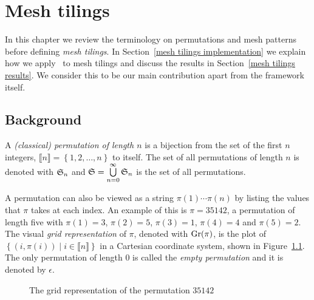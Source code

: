 \chapter{Mesh tilings\label{mesh tilings chapter}}

In this chapter we review the terminology on permutations and mesh patterns 
before defining \emph{mesh tilings}. In Section~\ref{mesh tilings 
implementation} we explain how we apply \CombCov\ to mesh tilings and discuss 
the results in Section~\ref{mesh tilings results}. We consider this to be our
main contribution apart from the framework itself.

\section{Background\label{mesh tilings background}}

\begin{definition}
  A \emph{(classical) permutation of length $n$} is a bijection from the set of 
  the first $n$ integers, $\llbracket n \rrbracket = \left\{ 1, 2, \ldots, n 
  \right\}$ to itself. The set of all permutations of length $n$ is denoted with 
  $\S_n$ and $\S = \bigcup\limits_{n=0}^{\infty}\S_n$ is the set of all 
  permutations.
\end{definition}

A permutation can also be viewed as a string $\pi(1)\cdots\pi(n)$ by listing the 
values that $\pi$ takes at each index. An example of this is $\pi = 35142$, a 
permutation of length five with $\pi(1) = 3$, $\pi(2) = 5$, $\pi(3) = 1$, 
$\pi(4) = 4$ and $\pi(5) = 2$. The visual \emph{grid representation} of $\pi$, 
denoted with $\Gr{\pi}$, is the plot of $\left\{ (i, \pi(i)) \mid i \in 
\llbracket n \rrbracket \right\}$ in a Cartesian coordinate system, shown in 
Figure~\ref{figure: Gr(35142)}. The only permutation of length 0 is called the 
\emph{empty permutation} and it is denoted by $\epsilon$.

\begin{figure}[htbp]
  \center
  \caption{The grid representation of the permutation $35142$}
  \label{figure: Gr(35142)}
\end{figure}

